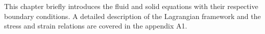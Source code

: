 This chapter briefly introduces the fluid and solid equations with their respective boundary conditions. A detailed description of the Lagrangian framework and the stress and strain relations are covered in the appendix A1.

